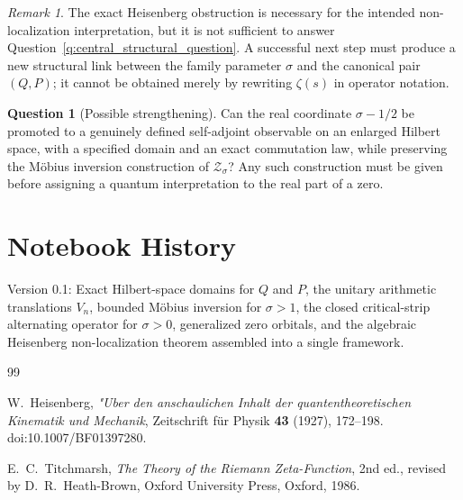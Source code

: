 \documentclass[11pt]{amsart}
\numberwithin{equation}{section}
\theoremstyle{plain}
\theoremstyle{definition}
\newtheorem{question}[theorem]{Question}
\theoremstyle{remark}
\newtheorem{remark}[theorem]{Remark}
\begin{document}
\begin{remark}
\label{rem:heisenberg_not_enough_for_RH}
The exact Heisenberg obstruction is necessary for the intended
non-localization interpretation, but it is not sufficient to answer
Question~\ref{q:central_structural_question}.  A successful next step must
produce a new structural link between the family parameter $\sigma$ and
the canonical pair $(Q,P)$; it cannot be obtained merely by rewriting
$\zeta(s)$ in operator notation.
\end{remark}

\begin{question}[Possible strengthening]
\label{q:beta_operator_question}
Can the real coordinate $\sigma-1/2$ be promoted to a genuinely defined
self-adjoint observable on an enlarged Hilbert space, with a specified
domain and an exact commutation law, while preserving the M\"obius inversion
construction of $\mathcal Z_\sigma$?  Any such construction must be given
before assigning a quantum interpretation to the real part of a zero.
\end{question}

\section*{Notebook History}

\noindent Version 0.1: Exact Hilbert-space domains for $Q$ and $P$, the
unitary arithmetic translations $V_n$, bounded M\"obius inversion for
$\sigma>1$, the closed critical-strip alternating operator for $\sigma>0$,
generalized zero orbitals, and the algebraic Heisenberg non-localization
theorem assembled into a single framework.

\begin{thebibliography}{99}

W.~Heisenberg,
\emph{"Uber den anschaulichen Inhalt der quantentheoretischen Kinematik und
Mechanik},
Zeitschrift f\"ur Physik \textbf{43} (1927), 172--198.
doi:10.1007/BF01397280.

E.~C.~Titchmarsh,
\emph{The Theory of the Riemann Zeta-Function},
2nd ed., revised by D.~R.~Heath-Brown,
Oxford University Press, Oxford, 1986.

\end{thebibliography}
\end{document}
